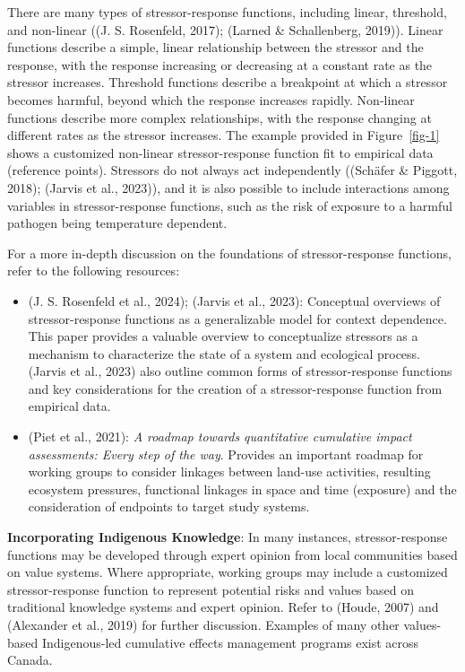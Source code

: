 \documentclass[
  letterpaper,
  DIV=11,
  numbers=noendperiod]{scrreprt}
\providecommand{\tightlist}{%
  \setlength{\itemsep}{0pt}\setlength{\parskip}{0pt}}
\begin{document}
There are many types of stressor-response functions, including linear,
threshold, and non-linear ((J. S. Rosenfeld, 2017); (Larned \&
Schallenberg, 2019)). Linear functions describe a simple, linear
relationship between the stressor and the response, with the response
increasing or decreasing at a constant rate as the stressor increases.
Threshold functions describe a breakpoint at which a stressor becomes
harmful, beyond which the response increases rapidly. Non-linear
functions describe more complex relationships, with the response
changing at different rates as the stressor increases. The example
provided in Figure~\ref{fig-1} shows a customized non-linear
stressor-response function fit to empirical data (reference points).
Stressors do not always act independently ((Schäfer \& Piggott, 2018);
(Jarvis et al., 2023)), and it is also possible to include interactions
among variables in stressor-response functions, such as the risk of
exposure to a harmful pathogen being temperature dependent.

For a more in-depth discussion on the foundations of stressor-response
functions, refer to the following resources:

\begin{itemize}
\tightlist
\item
  (J. S. Rosenfeld et al., 2024); (Jarvis et al., 2023): Conceptual
  overviews of stressor-response functions as a generalizable model for
  context dependence. This paper provides a valuable overview to
  conceptualize stressors as a mechanism to characterize the state of a
  system and ecological process. (Jarvis et al., 2023) also outline
  common forms of stressor-response functions and key considerations for
  the creation of a stressor-response function from empirical data.
\item
  (Piet et al., 2021): \emph{A roadmap towards quantitative cumulative
  impact assessments: Every step of the way}. Provides an important
  roadmap for working groups to consider linkages between land-use
  activities, resulting ecosystem pressures, functional linkages in
  space and time (exposure) and the consideration of endpoints to target
  study systems.
\end{itemize}

\textbf{Incorporating Indigenous Knowledge}: In many instances,
stressor-response functions may be developed through expert opinion from
local communities based on value systems. Where appropriate, working
groups may include a customized stressor-response function to represent
potential risks and values based on traditional knowledge systems and
expert opinion. Refer to (Houde, 2007) and (Alexander et al., 2019) for
further discussion. Examples of many other values-based Indigenous-led
cumulative effects management programs exist across Canada.
\end{document}

